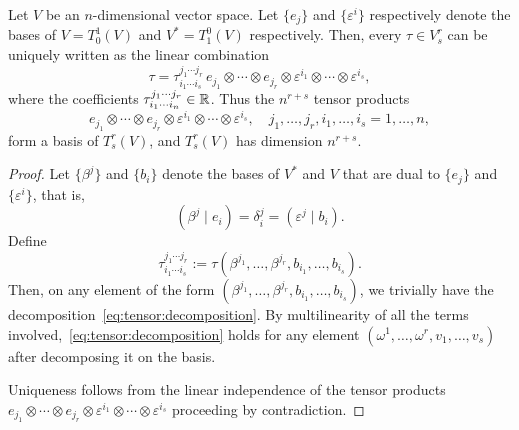 \begin{proposition}\label{prop:tensorbasis}
  Let $V$ be an $n$-dimensional vector space.
  Let $\{e_j\}$ and $\{\varepsilon^i\}$ respectively denote the bases of $V=T_0^1(V)$ and $V^*=T_1^0(V)$ respectively.
  Then, every $\tau\in V_s^r$ can be uniquely written as the linear combination%
  \begin{equation}\label{eq:tensor:decomposition}
    \tau = \tau^{j_1\cdots j_r}_{i_1\cdots i_s} \, e_{j_1}\otimes\cdots\otimes e_{j_r}\otimes \varepsilon^{i_1}\otimes \cdots\otimes \varepsilon^{i_s},
  \end{equation}
  where the coefficients $\tau^{j_1\cdots j_r}_{i_1\cdots i_n}\in\mathbb{R}$.
  Thus the $n^{r+s}$ tensor products
  \begin{equation}\label{eq:tensor:decompo}
    e_{j_1}\otimes\cdots\otimes e_{j_r}\otimes \varepsilon^{i_1}\otimes \cdots\otimes \varepsilon^{i_s}, \quad j_1,\ldots,j_r, i_1,\ldots,i_s = 1,\ldots,n,
  \end{equation}
  form a basis of $T_s^r(V)$, and $T_s^r(V)$ has dimension $n^{r+s}$.
\end{proposition}

\begin{proof}
  Let $\{\beta^j\}$ and $\{b_i\}$ denote the bases of $V^*$ and $V$ that are dual to $\{e_j\}$ and $\{\varepsilon^i\}$, that is,
  \begin{equation}
    (\beta^j\mid e_i) = \delta^j_i = (\varepsilon^j \mid b_i).
  \end{equation}
  Define
  \begin{equation}
    \tau^{j_1\cdots j_r}_{i_1\cdots i_s} := \tau(\beta^{j_1}, \ldots, \beta^{j_r}, b_{i_1}, \ldots, b_{i_s}).
  \end{equation}
  Then, on any element of the form $(\beta^{j_1}, \ldots, \beta^{j_r}, b_{i_1}, \ldots, b_{i_s})$, we trivially have the decomposition~\eqref{eq:tensor:decomposition}. By multilinearity of all the terms involved,~\eqref{eq:tensor:decomposition} holds for any element $(\omega^1, \ldots, \omega^r, v_1, \ldots, v_s)$ after decomposing it on the basis.

  Uniqueness follows from the linear independence of the tensor products $e_{j_1}\otimes\cdots\otimes e_{j_r}\otimes \varepsilon^{i_1}\otimes \cdots\otimes \varepsilon^{i_s}$ proceeding by contradiction.
\end{proof}

